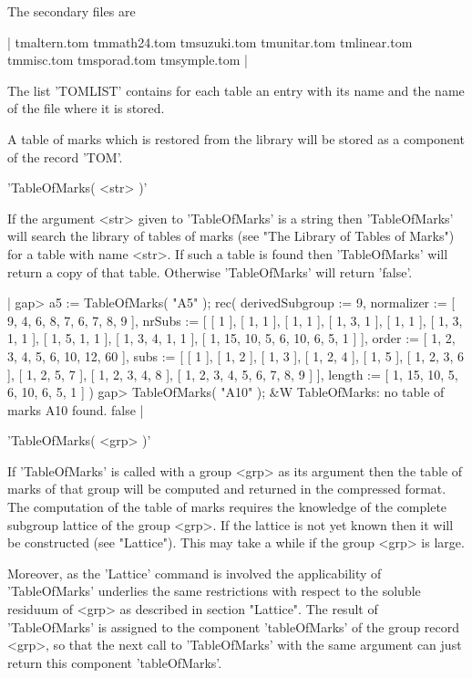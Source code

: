 The secondary files are

|    tmaltern.tom  tmmath24.tom  tmsuzuki.tom  tmunitar.tom
    tmlinear.tom  tmmisc.tom    tmsporad.tom  tmsymple.tom |

The list 'TOMLIST' contains for each table an entry with its name and the
name of the file where it is stored.

A table  of marks which is restored from  the library will be stored as a
component of the record 'TOM'.


'TableOfMarks( <str> )'

If  the  argument  <str>  given   to  'TableOfMarks'  is  a  string  then
'TableOfMarks'  will  search  the  library of tables  of marks  (see "The
Library of  Tables of  Marks") for  a table with  name  <str>.  If such a
table is found then  'TableOfMarks' will  return  a  copy of  that table.
Otherwise 'TableOfMarks' will return 'false'.

|    gap> a5 := TableOfMarks( "A5" );
    rec(
      derivedSubgroup := 9,
      normalizer := [ 9, 4, 6, 8, 7, 6, 7, 8, 9 ],
      nrSubs := [ [ 1 ], [ 1, 1 ], [ 1, 1 ], [ 1, 3, 1 ], [ 1, 1 ],
          [ 1, 3, 1, 1 ], [ 1, 5, 1, 1 ], [ 1, 3, 4, 1, 1 ],
          [ 1, 15, 10, 5, 6, 10, 6, 5, 1 ] ],
      order := [ 1, 2, 3, 4, 5, 6, 10, 12, 60 ],
      subs := [ [ 1 ], [ 1, 2 ], [ 1, 3 ], [ 1, 2, 4 ], [ 1, 5 ],
          [ 1, 2, 3, 6 ], [ 1, 2, 5, 7 ], [ 1, 2, 3, 4, 8 ],
          [ 1, 2, 3, 4, 5, 6, 7, 8, 9 ] ],
      length := [ 1, 15, 10, 5, 6, 10, 6, 5, 1 ] )
    gap> TableOfMarks( "A10" );
    &W  TableOfMarks: no table of marks A10 found.
    false |

'TableOfMarks( <grp> )'

If  'TableOfMarks' is called with a  group <grp> as its argument then the
table of marks  of  that  group  will  be  computed and  returned in  the
compressed format.  The computation of the  table of  marks  requires the
knowledge of the  complete subgroup  lattice  of the group <grp>.  If the
lattice is not yet known  then  it will be  constructed (see  "Lattice").
This  may  take a  while  if the group  <grp>  is  large.

Moreover,  as  the 'Lattice'  command  is  involved  the applicability of
'TableOfMarks' underlies  the  same  restrictions  with  respect  to  the
soluble residuum of <grp> as  described in section "Lattice".  The result
of  'TableOfMarks' is  assigned to the  component  'tableOfMarks' of  the
group record <grp>, so that the next call to 'TableOfMarks' with the same
argument can just return this component 'tableOfMarks'.

